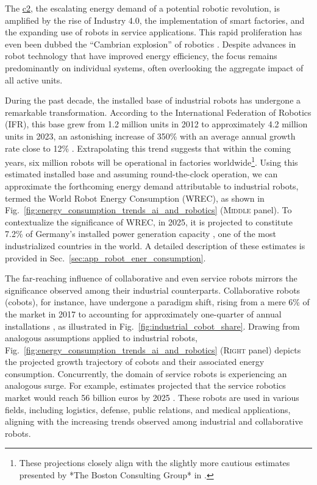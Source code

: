 \documentclass[12pt]{article}
\begin{document}
The \underline{\ac{c2}}, the escalating energy demand of a potential robotic revolution, is amplified by the rise of Industry 4.0, the implementation of smart factories, and the expanding use of robots in service applications. This rapid proliferation has even been dubbed the ``Cambrian explosion'' of robotics \cite{Pratt2015Iscambrianexplosion}. Despite advances in robot technology that have improved energy efficiency, the focus remains predominantly on individual systems, often overlooking the aggregate impact of all active units.

During the past decade, the installed base of industrial robots has undergone a remarkable transformation. According to the International Federation of Robotics (IFR), this base grew from 1.2 million units in 2012 to approximately 4.2 million units in 2023, an astonishing increase of 350\% with an average annual growth rate close to 12\% \cite{IFR2024WorldRobotics2024}. Extrapolating this trend suggests that within the coming years, six million robots will be operational in factories worldwide\footnote{These projections closely align with the slightly more cautious estimates presented by *The Boston Consulting Group* in \cite{Sirkin2015HowRobotsWill}.}. Using this estimated installed base and assuming round-the-clock operation, we can approximate the forthcoming energy demand attributable to industrial robots, termed the World Robot Energy Consumption (WREC), as shown in Fig.~\ref{fig:energy_consumption_trends_ai_and_robotics} (\textsc{Middle} panel). To contextualize the significance of WREC, in 2025, it is projected to constitute 7.2\% of Germany's installed power generation capacity \cite{FraunhoferISENetinstalledelectricity}, one of the most industrialized countries in the world. A detailed description of these estimates is provided in Sec.~\ref{sec:app_robot_ener_consumption}.

The far-reaching influence of collaborative and even service robots mirrors the significance observed among their industrial counterparts. Collaborative robots (cobots), for instance, have undergone a paradigm shift, rising from a mere 6\% of the market in 2017 to accounting for approximately one-quarter of annual installations \cite{tobe2015}, as illustrated in Fig.~\ref{fig:industrial_cobot_share}. Drawing from analogous assumptions applied to industrial robots, Fig.~\ref{fig:energy_consumption_trends_ai_and_robotics} (\textsc{Right} panel) depicts the projected growth trajectory of cobots and their associated energy consumption. Concurrently, the domain of service robots is experiencing an analogous surge. For example, estimates projected that the service robotics market would reach 56 billion euros by 2025 \cite{statista_service_robots}. These robots are used in various fields, including logistics, defense, public relations, and medical applications, aligning with the increasing trends observed among industrial and collaborative robots.
\end{document}
